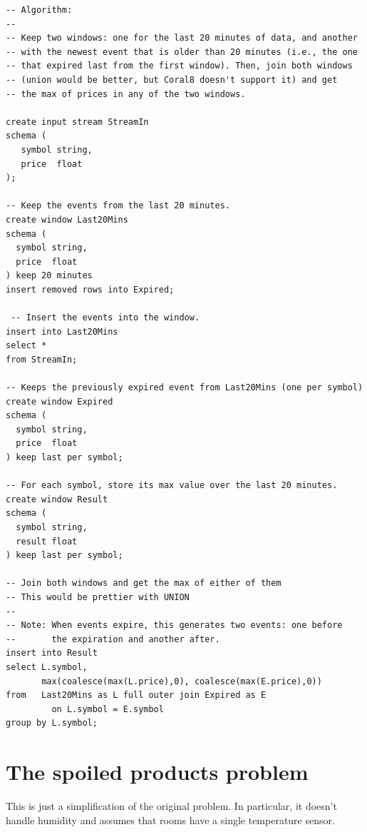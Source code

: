 \documentclass{report}
\begin{document}
\begin{lstlisting}
-- Algorithm:
--
-- Keep two windows: one for the last 20 minutes of data, and another
-- with the newest event that is older than 20 minutes (i.e., the one
-- that expired last from the first window). Then, join both windows
-- (union would be better, but Coral8 doesn't support it) and get
-- the max of prices in any of the two windows.

create input stream StreamIn
schema (
   symbol string,
   price  float
);

-- Keep the events from the last 20 minutes.
create window Last20Mins
schema (
  symbol string,
  price  float
) keep 20 minutes
insert removed rows into Expired;

 -- Insert the events into the window.
insert into Last20Mins
select *
from StreamIn;

-- Keeps the previously expired event from Last20Mins (one per symbol)
create window Expired
schema (
  symbol string,
  price  float
) keep last per symbol;

-- For each symbol, store its max value over the last 20 minutes.
create window Result
schema (
  symbol string,
  result float
) keep last per symbol;

-- Join both windows and get the max of either of them
-- This would be prettier with UNION
--
-- Note: When events expire, this generates two events: one before
--       the expiration and another after.
insert into Result
select L.symbol,
       max(coalesce(max(L.price),0), coalesce(max(E.price),0))
from   Last20Mins as L full outer join Expired as E
         on L.symbol = E.symbol
group by L.symbol;
\end{lstlisting}

\section{The spoiled products problem}
\label{sec:spoiled-products-solution}

This is just a simplification of the original problem. In particular,
it doesn't handle humidity and assumes that rooms have a single
temperature sensor.
\end{document}
